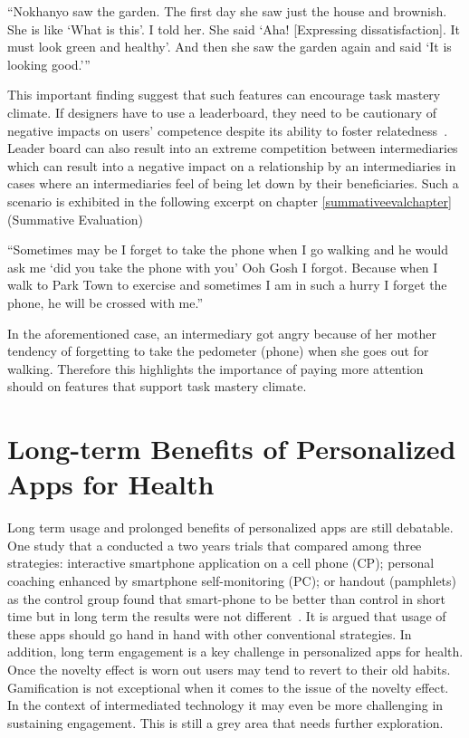  {``Nokhanyo saw the garden. The first day she saw just the house and brownish. She
is like `What is this'. I told her. She said `Aha! [Expressing
dissatisfaction]. It must look green and healthy'. And then
she saw the garden again and said `It is looking good.'''}

This important finding suggest that such features can encourage task mastery climate. If designers have to use a leaderboard, they need to be cautionary of negative impacts on users' competence despite its ability to foster relatedness~\citep{sailer2013:psychological}. Leader board can also result into an extreme competition between intermediaries which can result into a negative impact on a relationship by an intermediaries in cases where an intermediaries feel of being let down by their beneficiaries. Such a scenario is exhibited in the following excerpt on chapter \ref{summativeevalchapter} (Summative Evaluation)
 
 {``Sometimes may be I forget to take the phone when I go walking and he would ask me `did you take the phone with you' Ooh Gosh I forgot.  Because when I walk to Park Town to exercise and sometimes  I am in such a hurry I forget the phone, he will be crossed with me.''} 

In the aforementioned case, an intermediary got angry because of her mother tendency of forgetting to take the pedometer (phone) when she goes out for walking. Therefore this highlights the importance of paying more attention should on features that support task mastery climate.

\section{Long-term Benefits of Personalized Apps for Health} 
Long term usage and prolonged benefits of personalized apps are still debatable. One study that a conducted a two years trials that compared among three strategies: interactive smartphone application on a cell phone (CP); personal coaching enhanced by smartphone self-monitoring (PC); or handout (pamphlets) as the control group found that smart-phone to be better than control in short time but in long term the results were not different~\citep{svetkey2015cell}. It is argued that usage of these apps should go hand in hand with other conventional strategies. In addition,  long  term engagement is a key challenge in personalized apps for health. Once the novelty effect is worn out users may tend to revert to their old habits. Gamification is not exceptional when it comes to the issue of the novelty effect. In the context of intermediated technology it may even be more challenging in sustaining engagement. This is still a grey area that needs further exploration.
 
\begin{flushright}
\end{flushright}
